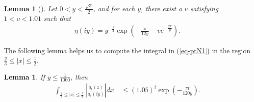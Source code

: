 \documentclass[10pt,a4paper]{amsart}
\newtheorem{lemma}[theorem]{Lemma}
\renewcommand{\Im}{\operatorname{Im}}
\numberwithin{equation}{section}
\begin{document}
	\begin{lemma}[{\cite[Lemma 3.4]{barman2025lower}}]\label{lemma-2.2}
		Let $0<y<\frac{\sqrt{3}}{2}$, and for each $y$, there exist a $v$ satisfying $1<v<1.01$ such that
		\begin{align*}
			\eta(iy) = y^{-\frac{1}{2}} \exp\left( -\frac{\pi}{12y} - v e^{-\frac{2\pi}{y}} \right).
		\end{align*}
	\end{lemma}	
	The following lemma helps us to compute the integral in (\ref{eq-ptN1}) in the region $\frac{y}{3} \le |x| \le \frac{1}{2}$.
	\begin{lemma}\label{proposition-error}
		If $y\le \frac{1}{1000}$, then 
		\begin{align*}
			\int_{\frac{y}{3}\le |x|\le \frac{1}{2}}\left|\frac{a_t(z)}{a_t(iy)}\right|dx\ &\le (1.05)^{t} \exp\left(-\frac{\pi t}{120y}\right).
		\end{align*}
	\end{lemma}
\end{document}

